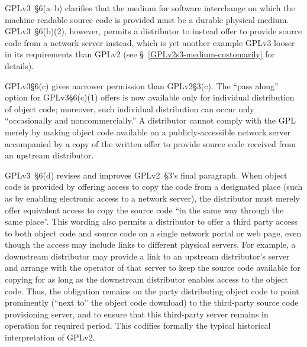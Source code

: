 GPLv3~\S6(a--b) clarifies that the medium for software interchange on which
the machine-readable source code is provided must be a durable physical
medium.  GPLv3~\S6(b)(2), however, permits a distributor to instead offer to
provide source code from a network server instead, which is yet another
example GPLv3 looser in its requirements than GPLv2 (see
\S~\ref{GPLv2s3-medium-customarily} for details).


GPLv3\S6(c) gives narrower permission than GPLv2\S3(c).  The ``pass along''
option for GPLv3\S6(c)(1) offers is now available only for individual
distribution of object code; moreover, such individual distribution can occur
only ``occasionally and noncommercially.''  A distributor cannot comply with
the GPL merely by making object code available on a publicly-accessible
network server accompanied by a copy of the written offer to provide source
code received from an upstream distributor.


GPLv3~\S6(d) revises and improves GPLv2~\S3's final paragraph.  When object
code is provided by offering access to copy the code from a designated place
(such as by enabling electronic access to a network server), the distributor
must merely offer equivalent access to copy the source code ``in the same way
through the same place''.  This wording also permits a distributor to offer a
third party access to both object code and source code on a single network
portal or web page, even though the access may include links to different
physical servers.  For example, a downstream distributor may provide a link
to an upstream distributor's server and arrange with the operator of that
server to keep the source code available for copying for as long as the
downstream distributor enables access to the object code.  Thus,
the obligation remains on the party distributing object code to point
prominently (``next to'' the object code download) to the third-party source
code provisioning server, and to ensure that this third-party server remains
in operation for required period.  This codifies formally the typical
historical interpretation of GPLv2.


